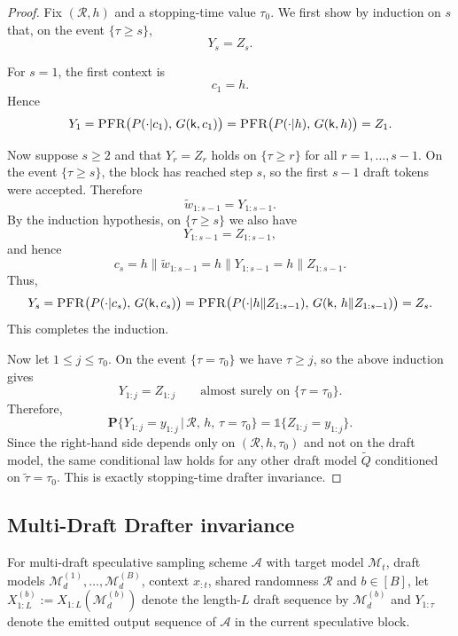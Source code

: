 \documentclass{article}
\theoremstyle{plain}
\theoremstyle{definition}
\begin{document}
\begin{proof}
Fix $(\mathcal{R},h)$ and a stopping-time value $\tau_0$.
We first show by induction on $s$ that, on the event $\{\tau\ge s\}$,
\[
Y_s=Z_s.
\]

For $s=1$, the first context is
\[
c_1=h.
\]
Hence
\[
Y_1
=
\textsc{PFR}\bigl(P(\cdot | c_1),\,G(\mathsf{k},c_1)\bigr)
=
\textsc{PFR}\bigl(P(\cdot | h),\,G(\mathsf{k},h)\bigr)
=
Z_1.
\]

Now suppose $s\ge 2$ and that $Y_r=Z_r$ holds on $\{\tau\ge r\}$ for all
$r=1,\ldots,s-1$. On the event $\{\tau\ge s\}$, the block has reached step $s$,
so the first $s-1$ draft tokens were accepted. Therefore
\[
\tilde w_{1:s-1}=Y_{1:s-1}.
\]
By the induction hypothesis, on $\{\tau\ge s\}$ we also have
\[
Y_{1:s-1}=Z_{1:s-1},
\]
and hence
\[
c_s
=
h\|\tilde w_{1:s-1}
=
h\|Y_{1:s-1}
=
h\|Z_{1:s-1}.
\]
Thus,
\[
Y_s
=
\textsc{PFR}\bigl(P(\cdot | c_s),\,G(\mathsf{k},c_s)\bigr)
=
\textsc{PFR}\bigl(P(\cdot | h\|Z_{1:s-1}),\,G(\mathsf{k},\,h\|Z_{1:s-1})\bigr)
=
Z_s.
\]
This completes the induction.

Now let $1\le j\le \tau_0$. On the event $\{\tau=\tau_0\}$ we have
$\tau\ge j$, so the above induction gives
\[
Y_{1:j}=Z_{1:j}
\qquad\text{almost surely on }\{\tau=\tau_0\}.
\]
Therefore,
\[
\mathbf{P}\bigl\{
Y_{1:j}=y_{1:j}\,\big|\,\mathcal{R},\,h,\,\tau=\tau_0
\bigr\}
=
\mathds{1}\{Z_{1:j}=y_{1:j}\}.
\]
Since the right-hand side depends only on $(\mathcal{R},h,\tau_0)$ and not on
the draft model, the same conditional law holds for any other draft model
$\widetilde Q$ conditioned on $\widetilde\tau=\tau_0$. This is exactly
stopping-time drafter invariance.
\end{proof}


\subsection{Multi-Draft Drafter invariance}
\label{subapp::multi_draft_invariance}

For multi-draft speculative sampling scheme $\mathcal{A}$ with target model $\mathcal{M}_t$, draft models $\mathcal{M}_d^{(1)},\ldots,\mathcal{M}_d^{(B)}$, context $x_{:t}$, shared randomness $\mathcal{R}$ and $b\in[B]$, let $X_{1:L}^{(b)} := X_{1:L}(\mathcal{M}_d^{(b)})$ denote the length-$L$ draft sequence by $\mathcal{M}_d^{(b)}$ and $Y_{1:\tau}$ denote the emitted output sequence of $\mathcal{A}$ in the current speculative block.
\end{document}
